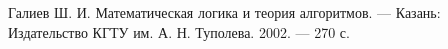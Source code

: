 \begin{thebibliography}{9}

Галиев Ш. И.
Математическая логика и теория алгоритмов.
--- Казань: Издательство КГТУ им. А. Н. Туполева.
2002. --- 270 с.

\end{thebibliography}
